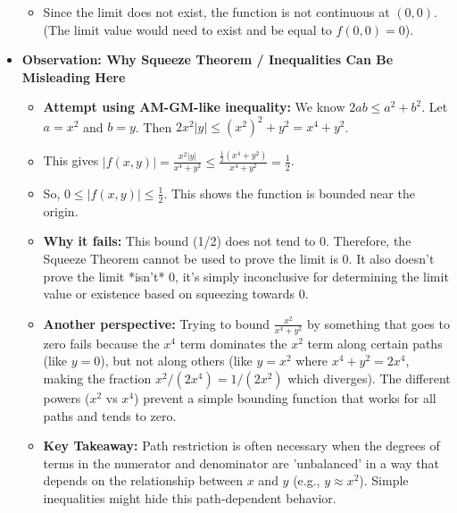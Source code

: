 \begin{cascade}
\begin{itemize}
\begin{itemize}
			      \item Since the limit does not exist, the function is not continuous at $(0,0)$. (The limit value would need to exist and be equal to $f(0,0)=0$).
		      \end{itemize}
		\item \textbf{Observation: Why Squeeze Theorem / Inequalities Can Be Misleading Here}
		      \begin{itemize}
			      \item \textbf{Attempt using AM-GM-like inequality:} We know $2ab \le a^2+b^2$. Let $a=x^2$ and $b=y$. Then $2x^2|y| \le (x^2)^2 + y^2 = x^4 + y^2$.
			      \item This gives $|f(x,y)| = \frac{x^2 |y|}{x^4 + y^2} \le \frac{\frac{1}{2}(x^4 + y^2)}{x^4 + y^2} = \frac{1}{2}$.
			      \item So, $0 \le |f(x,y)| \le \frac{1}{2}$. This shows the function is bounded near the origin.
			      \item \textbf{Why it fails:} This bound (1/2) does not tend to 0. Therefore, the Squeeze Theorem cannot be used to prove the limit is 0. It also doesn't prove the limit *isn't* 0, it's simply inconclusive for determining the limit value or existence based on squeezing towards 0.
			      \item \textbf{Another perspective:} Trying to bound $\frac{x^2}{x^4+y^2}$ by something that goes to zero fails because the $x^4$ term dominates the $x^2$ term along certain paths (like $y=0$), but not along others (like $y=x^2$ where $x^4+y^2 = 2x^4$, making the fraction $x^2/(2x^4) = 1/(2x^2)$ which diverges). The different powers ($x^2$ vs $x^4$) prevent a simple bounding function that works for all paths and tends to zero.
			      \item \textbf{Key Takeaway:} Path restriction is often necessary when the degrees of terms in the numerator and denominator are 'unbalanced' in a way that depends on the relationship between $x$ and $y$ (e.g., $y \approx x^2$). Simple inequalities might hide this path-dependent behavior.
		      \end{itemize}
	\end{itemize}
\end{cascade}

\clearpage
